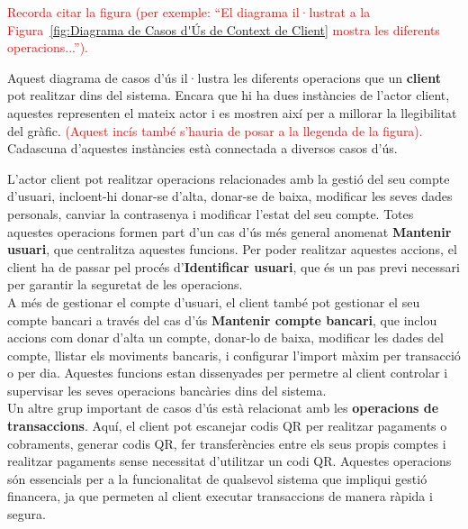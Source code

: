 \documentclass[a4paper,12pt,twoside]{ThesisStyle}
\newcommand{\pau}[1]{\textcolor{red}{#1}}
\begin{document}
\pau{Recorda citar la figura (per exemple: ``El diagrama il·lustrat a la Figura~\ref{fig:Diagrama de Casos d'Ús de Context de Client} mostra les diferents operacions...'').}

Aquest diagrama de casos d'ús il·lustra les diferents operacions que un \textbf{client} pot realitzar dins del sistema. Encara que hi ha dues instàncies de l'actor client, aquestes representen el mateix actor i es mostren així per a millorar la llegibilitat del gràfic. \pau{(Aquest incís també s'hauria de posar a la llegenda de la figura).} Cadascuna d'aquestes instàncies està connectada a diversos casos d'ús.

L'actor client pot realitzar operacions relacionades amb la gestió del seu compte d'usuari, incloent-hi donar-se d'alta, donar-se de baixa, modificar les seves dades personals, canviar la contrasenya i modificar l'estat del seu compte. Totes aquestes operacions formen part d'un cas d'ús més general anomenat \textbf{Mantenir usuari}, que centralitza aquestes funcions. Per poder realitzar aquestes accions, el client ha de passar pel procés d'\textbf{Identificar usuari}, que és un pas previ necessari per garantir la seguretat de les operacions.\\

A més de gestionar el compte d'usuari, el client també pot gestionar el seu compte bancari a través del cas d'ús \textbf{Mantenir compte bancari}, que inclou accions com donar d'alta un compte, donar-lo de baixa, modificar les dades del compte, llistar els moviments bancaris, i configurar l'import màxim per transacció o per dia. Aquestes funcions estan dissenyades per permetre al client controlar i supervisar les seves operacions bancàries dins del sistema.\\

Un altre grup important de casos d'ús està relacionat amb les \textbf{operacions de transaccions}. Aquí, el client pot escanejar codis QR per realitzar pagaments o cobraments, generar codis QR, fer transferències entre els seus propis comptes i realitzar pagaments sense necessitat d'utilitzar un codi QR. Aquestes operacions són essencials per a la funcionalitat de qualsevol sistema que impliqui gestió financera, ja que permeten al client executar transaccions de manera ràpida i segura.\\
\end{document}

